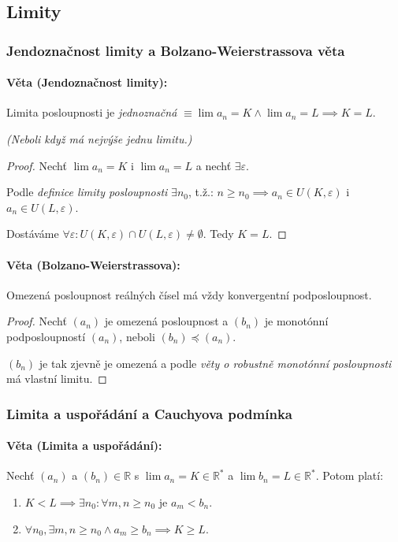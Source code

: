 \documentclass[10pt,a4paper]{article}
\newcommand{\R}{{\mathbb{R}}}
\begin{document}
\subsection{Limity}

\subsubsection{Jendoznačnost limity a Bolzano-Weierstrassova věta}

\paragraph*{Věta (Jendoznačnost limity):} Limita posloupnosti je \textit{jednoznačná} $\equiv \lim a_n = K \land \lim a_n = L \implies K = L$.

\textit{(Neboli když má nejvýše jednu limitu.)}
\begin{proof}
    Nechť $\lim a_n = K$ i $\lim a_n = L$ a nechť $\exists \varepsilon$. 
    
    Podle \textit{definice limity posloupnosti} $\exists n_0$, t.ž.: $n\geq n_0  \implies a_n \in U(K, \varepsilon)$ i $a_n \in U(L, \varepsilon)$. 
    
    Dostáváme $\forall \varepsilon: U(K, \varepsilon) \cap U(L, \varepsilon) \neq \emptyset$. 
    Tedy $K = L$.
\end{proof}

\paragraph*{Věta (Bolzano-Weierstrassova):} Omezená posloupnost reálných čísel má vždy konvergentní podposloupnost.

\begin{proof}
    Nechť $(a_n)$ je omezená posloupnost a $(b_n)$ je monotónní podposloupností $(a_n)$, neboli $(b_n) \preceq (a_n)$.
    
    $(b_n)$ je tak zjevně je omezená a podle \textit{věty o robustně monotónní posloupnosti} má vlastní limitu.
\end{proof}

\subsubsection{Limita a uspořádání a Cauchyova podmínka}

\paragraph*{Věta (Limita a uspořádání):} Nechť $(a_n)$ a $(b_n)\in \R$ s $\lim a_n = K \in \R^*$ a $\lim b_n = L \in \R^*$. Potom platí:
\begin{enumerate}
    \item $K < L \implies \exists n_0 : \forall m, n \geq n_0$ je $a_m < b_n$.
    \item $\forall n_0, \exists m, n \geq n_0 \land a_m \geq b_n \implies K \geq L$.    
\end{enumerate}
\end{document}
